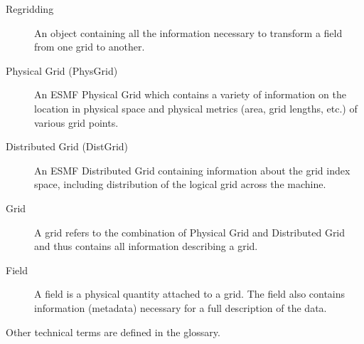
\begin{description}

\item [Regridding] \label{term:regridding}
      An object containing all the information necessary to
      transform a field from one grid to another.
      
\item [Physical Grid (PhysGrid)] \label{term:physgrid} 
      An ESMF Physical Grid which contains a variety of information
      on the location in physical space and physical metrics (area,
      grid lengths, etc.) of various grid points.

\item [Distributed Grid (DistGrid)] \label{term:distgrid}
      An ESMF Distributed Grid containing information about the
      grid index space, including distribution of the logical
      grid across the machine.

\item [Grid] \label{term:grid}
      A grid refers to the combination of Physical Grid and
      Distributed Grid and thus contains all information
      describing a grid.

\item [Field] \label{term:field}
      A field is a physical quantity attached to
      a grid.  The field also contains information (metadata)
      necessary for a full description of the data. 

\end{description}

\noindent Other technical terms are defined in the glossary.

